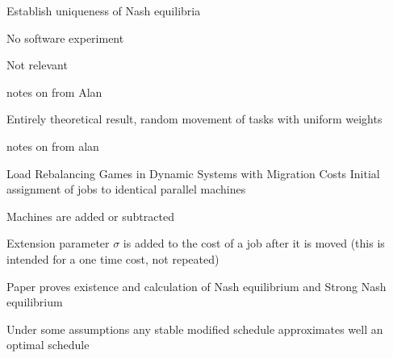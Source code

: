 \documentclass{article}
\begin{document}
Establish uniqueness of Nash equilibria

No software experiment

Not relevant






\cite{7967109}

notes on
\cite{7967109}
from Alan

Entirely theoretical result, random movement of tasks with uniform weights



\cite{BELIKOVETSKY201616}

notes on
\cite{BELIKOVETSKY201616}
from alan

Load Rebalancing Games in Dynamic Systems with Migration Costs 
Initial assignment of jobs to identical parallel machines

Machines are added or subtracted

Extension parameter $\sigma$ is added to the cost of a job after it is moved (this is intended for a one time cost, not repeated)

Paper proves existence and calculation of Nash equilibrium and Strong Nash equilibrium

Under some assumptions any stable modified schedule approximates well an optimal schedule
\end{document}
